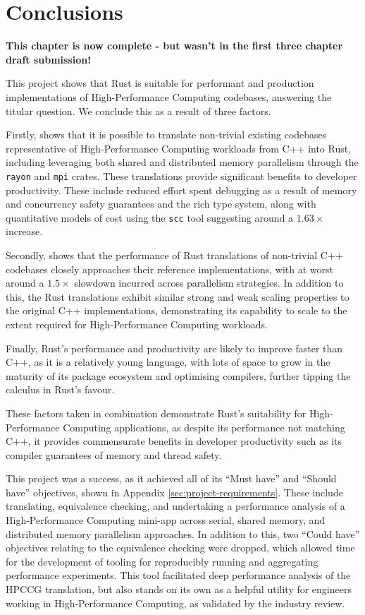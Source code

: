 \chapter{Conclusions}
\label{ch:conclusions} %

\textbf{This chapter is now complete - but wasn't in the first three chapter draft submission!}

This project shows that Rust is suitable for performant and production implementations of High-Performance Computing codebases, answering the titular question. We conclude this as a result of three factors.

Firstly,  shows that it is possible to translate non-trivial existing codebases representative of High-Performance Computing workloads from C++ into Rust, including leveraging both shared and distributed memory parallelism through the \texttt{rayon} and \texttt{mpi} crates. These translations provide significant benefits to developer productivity.
These include reduced effort spent debugging as a result of memory and concurrency safety guarantees and the rich type system, along with quantitative models of cost using the \texttt{scc} tool suggesting around a $1.63 \times$ increase.

Secondly,  shows that the performance of Rust translations of non-trivial C++ codebases closely approaches their reference implementations, with at worst around a $1.5 \times$ slowdown incurred across parallelism strategies. In addition to this, the Rust translations exhibit similar strong and weak scaling properties to the original C++ implementations, demonstrating its capability to scale to the extent required for High-Performance Computing workloads.

Finally, Rust's performance and productivity are likely to improve faster than C++, as it is a relatively young language, with lots of space to grow in the maturity of its package ecosystem and optimising compilers, further tipping the calculus in Rust's favour.

These factors taken in combination demonstrate Rust's suitability for High-Performance Computing applications, as despite its performance not matching C++, it provides commensurate benefits in developer productivity such as its compiler guarantees of memory and thread safety.

This project was a success, as it achieved all of its ``Must have'' and ``Should have'' objectives, shown in Appendix \ref{sec:project-requirements}. These include translating, equivalence checking, and undertaking a performance analysis of a High-Performance Computing mini-app across serial, shared memory, and distributed memory parallelism approaches. In addition to this, two ``Could have'' objectives relating to the equivalence checking were dropped, which allowed time for the development of tooling for reproducibly running and aggregating performance experiments. This tool facilitated deep performance analysis of the HPCCG translation, but also stands on its own as a helpful utility for engineers working in High-Performance Computing, as validated by the industry review.


